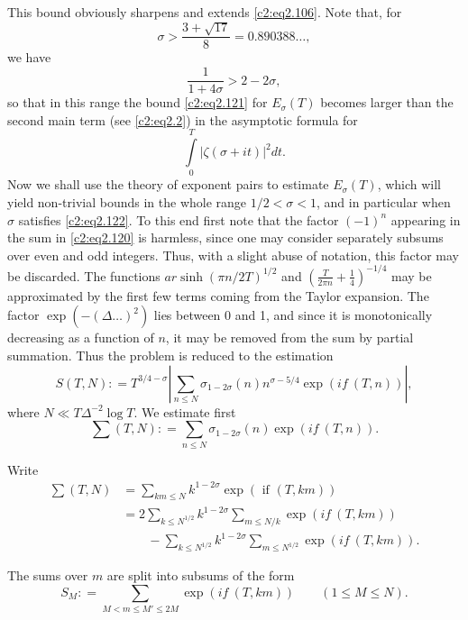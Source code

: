 This bound obviously sharpens and extends \eqref{c2:eq2.106}. Note
that, for 
\begin{equation}
  \sigma > \frac{3+ \sqrt{17}}{8} = 0.890388\ldots,\label{c2:eq2.122}
\end{equation}
we have
$$
\frac{1}{1+ 4\sigma} > 2 - 2 \sigma,
$$
so that in this range the bound \eqref{c2:eq2.121} for $E_\sigma (T)$
becomes larger than the second main term (see \eqref{c2:eq2.2}) in the
asymptotic formula for 
$${\int\limits_0^T |\zeta (\sigma +
  it)|^2}dt.$$ 
Now we shall use the theory of exponent pairs to
estimate $E_\sigma(T)$, which will yield non-trivial bounds in the
whole range $1/2 < \sigma < 1$, and in particular when $\sigma$
satisfies \eqref{c2:eq2.122}. To this end first note that the factor
$(-1)^n$ appearing in the sum in \eqref{c2:eq2.120} is harmless, since
one may consider separately subsums over even and odd integers. Thus,
with a slight abuse of notation, this factor may be discarded. The
functions $ar \sinh (\pi n/2T)^{1/2}$ and $\left(\frac{T}{2 \pi n} +
\frac{1}{4}\right)^{-1/4}$ may be approximated by the first few terms
coming from the Taylor expansion. The factor $\exp (-(\Delta 
\ldots)^2)$ lies between 0 and 1, and since it is monotonically
decreasing as a function of $n$, it may be removed from the sum by
partial summation. Thus the problem is reduced to the estimation
$$ 
S(T, N) : = T^{3/4-\sigma}\left| \sum_{n \leq N} \sigma_{1-2 \sigma}
(n) n^{\sigma -5/4} \exp (if~ (T, n))\right|,
$$
where $N \ll T \Delta ^{-2} \log T$. We estimate first
$$
  \sum (T, N): = \sum_{n \leq N} \sigma_{1- 2 \sigma} (n) \exp
  (if~ (T, n)).
$$

Write\pageoriginale
{\fontsize{10}{12}\selectfont
\begin{align*}
\sum (T, N) &= \sum_{km \leq N} k^{1- 2 \sigma} \exp (\mbox{ if } (T,
  km))\\
&= 2 \sum_{k \leq N^{1/2}} k^{1- 2 \sigma} \sum_{m \leq N/k}
  \exp(if~ (T, km))\\
&\qquad - \sum_{k \leq N^{1/2}} k^{1-2 \sigma}
  \sum_{m \leq N^{1/2}} \exp (if~ (T, km)).
\end{align*}}

The sums over $m$ are split into subsums of the form
$$
S_M : = \sum_{M< m \leq M' \leq 2M} \exp (if~ (T, km)) \qquad
(1 \leq M \leq N).
$$

